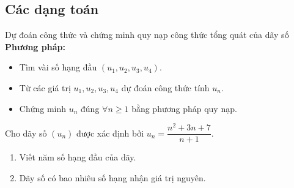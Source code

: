 \subsection{Các dạng toán}
\setcounter{\tcbcounter}{0}
\begin{dang}{Dự đoán công thức và chứng minh quy nạp công thức tổng quát của dãy số}
\textbf{Phương pháp:}
\begin{itemize}
\item Tìm vài số hạng đầu $(u_1, u_2, u_3, u_4)$.
\item Từ các giá trị $u_1, u_2, u_3, u_4$ dự đoán công thức tính $u_n$.
\item Chứng minh $u_n$ đúng $\forall n \geq 1$ bằng phương pháp quy nạp.
\end{itemize}
\end{dang}
\setcounter{vd}{0}
\setcounter{bt}{0}
\begin{vd}%
	Cho dãy số $(u_n)$ được xác định bởi $u_n=\dfrac{n^2+3n+7}{n+1}$.
	\begin{enumerate}
		\item Viết năm số hạng đầu của dãy.
		\item Dãy số có bao nhiêu số hạng nhận giá trị nguyên.
	\end{enumerate}
\end{vd}
